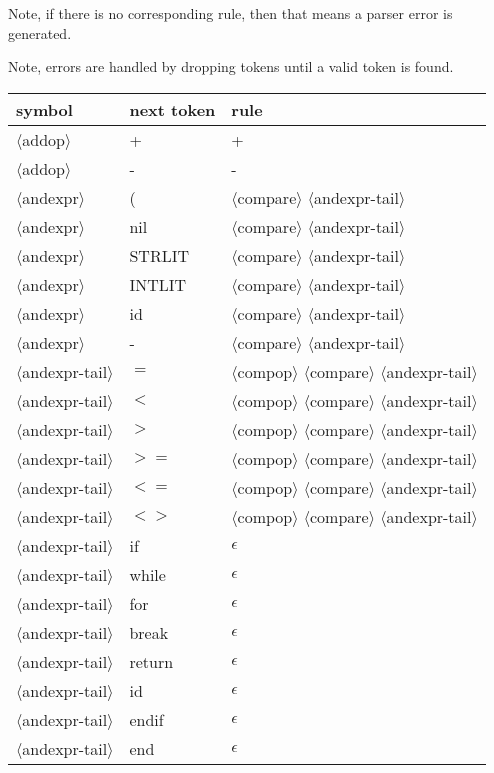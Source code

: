 \documentclass[11pt, fleqn]{article}
\newcommand{\atag}[1]{$\langle$#1$\rangle$}
\begin{document}
Note, if there is no corresponding rule, then that means a parser error is generated.

Note, errors are handled by dropping tokens until a valid token is found.

\begin{longtable}{l|l|l}
symbol							&	next token	&	rule									\\
\hline
\atag{addop}						&	+			&	+									\\
\atag{addop}						&	-			&	-									\\
\atag{andexpr} 					&	(			&	\atag{compare} \atag{andexpr-tail}	\\
\atag{andexpr} 					&	nil			&	\atag{compare} \atag{andexpr-tail}	\\
\atag{andexpr} 					&	STRLIT		&	\atag{compare} \atag{andexpr-tail}	\\
\atag{andexpr} 					&	INTLIT		&	\atag{compare} \atag{andexpr-tail}	\\
\atag{andexpr} 					&	id			&	\atag{compare} \atag{andexpr-tail}	\\
\atag{andexpr} 					&	-			&	\atag{compare} \atag{andexpr-tail}	\\
\atag{andexpr-tail}				&	$=$			&	\atag{compop} \atag{compare} \atag{andexpr-tail}	\\
\atag{andexpr-tail}				&	$<$			&	\atag{compop} \atag{compare} \atag{andexpr-tail}	\\
\atag{andexpr-tail}				&	$>$			&	\atag{compop} \atag{compare} \atag{andexpr-tail}	\\
\atag{andexpr-tail}				&	$>=$			&	\atag{compop} \atag{compare} \atag{andexpr-tail}	\\
\atag{andexpr-tail}				&	$<=$			&	\atag{compop} \atag{compare} \atag{andexpr-tail}	\\
\atag{andexpr-tail}				&	$<>$			&	\atag{compop} \atag{compare} \atag{andexpr-tail}	\\
\atag{andexpr-tail}				&	if			&	$\epsilon$	\\
\atag{andexpr-tail}				&	while		&	$\epsilon$	\\
\atag{andexpr-tail}				&	for			&	$\epsilon$	\\
\atag{andexpr-tail}				&	break		&	$\epsilon$	\\
\atag{andexpr-tail}				&	return		&	$\epsilon$	\\
\atag{andexpr-tail}				&	id			&	$\epsilon$	\\
\atag{andexpr-tail}				&	endif		&	$\epsilon$	\\
\atag{andexpr-tail}				&	end			&	$\epsilon$	\\

\end{longtable}
\end{document}
